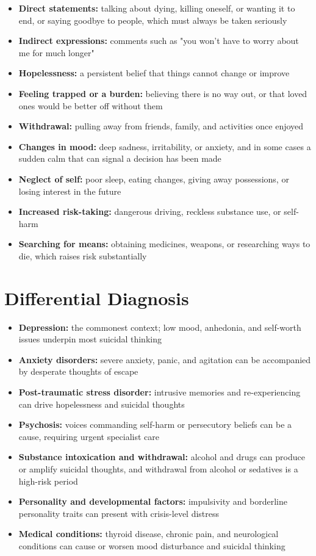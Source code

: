 \begin{itemize}
    \item \textbf{Direct statements:} talking about dying, killing oneself, or wanting it to end, or saying goodbye to people, which must always be taken seriously
    \item \textbf{Indirect expressions:} comments such as "you won't have to worry about me for much longer"
    \item \textbf{Hopelessness:} a persistent belief that things cannot change or improve
    \item \textbf{Feeling trapped or a burden:} believing there is no way out, or that loved ones would be better off without them
    \item \textbf{Withdrawal:} pulling away from friends, family, and activities once enjoyed
    \item \textbf{Changes in mood:} deep sadness, irritability, or anxiety, and in some cases a sudden calm that can signal a decision has been made
    \item \textbf{Neglect of self:} poor sleep, eating changes, giving away possessions, or losing interest in the future
    \item \textbf{Increased risk-taking:} dangerous driving, reckless substance use, or self-harm
    \item \textbf{Searching for means:} obtaining medicines, weapons, or researching ways to die, which raises risk substantially
\end{itemize}

\section*{Differential Diagnosis}
\begin{itemize}
    \item \textbf{Depression:} the commonest context; low mood, anhedonia, and self-worth issues underpin most suicidal thinking
    \item \textbf{Anxiety disorders:} severe anxiety, panic, and agitation can be accompanied by desperate thoughts of escape
    \item \textbf{Post-traumatic stress disorder:} intrusive memories and re-experiencing can drive hopelessness and suicidal thoughts
    \item \textbf{Psychosis:} voices commanding self-harm or persecutory beliefs can be a cause, requiring urgent specialist care
    \item \textbf{Substance intoxication and withdrawal:} alcohol and drugs can produce or amplify suicidal thoughts, and withdrawal from alcohol or sedatives is a high-risk period
    \item \textbf{Personality and developmental factors:} impulsivity and borderline personality traits can present with crisis-level distress
    \item \textbf{Medical conditions:} thyroid disease, chronic pain, and neurological conditions can cause or worsen mood disturbance and suicidal thinking
\end{itemize}

